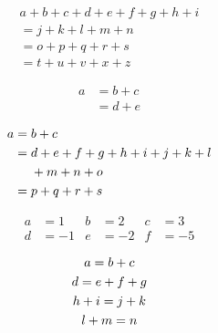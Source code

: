 \documentclass[12pt]{ctexrep}
\begin{document}

\begin{multline}
a + b + c + d + e + f
+ g + h + i \\
= j + k + l + m + n\\
= o + p + q + r + s\\
= t + u + v + x + z  
\end{multline}

\begin{align}
a & = b + c \\
& = d + e
\end{align}

\begin{align}
a ={} & b + c \\
  ={} & d + e + f + g + h + i
  + j + k + l \notag \\
  & + m + n +o \\
  ={} & p + q + r +s 
\end{align}

\begin{align}
a &=1  & b &=2  & c &=3 \\
d &=-1 & e &=-2 & f &=-5
\end{align}


\begin{gather}
a = b + c \\
d = e + f + g \\
h + i = j + k \notag \\
l + m = n
\end{gather}
\end{document}
